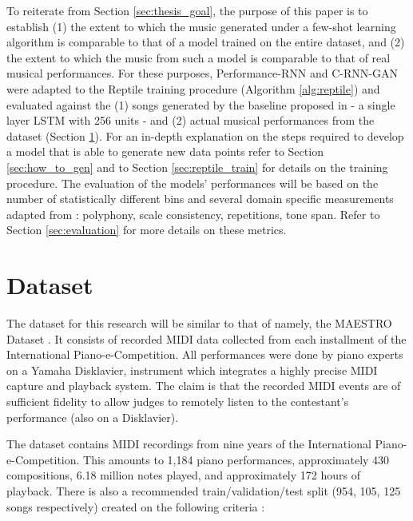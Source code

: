 \documentclass[a4paper]{book}
\begin{document}
To reiterate from Section \ref{sec:thesis_goal}, the purpose of this paper is to establish (1) the extent to which the music generated under a few-shot learning algorithm is comparable to that of a model trained on the entire dataset, and (2) the extent to which the music from such a model is comparable to that of real musical performances. For these purposes, Performance-RNN and C-RNN-GAN were adapted to the Reptile training procedure (Algorithm \ref{alg:reptile}) and evaluated against the (1) songs generated by the baseline proposed in \textcite{larochelle_few-shot_2017} - a single layer LSTM with 256 units - and (2) actual musical performances from the dataset (Section \ref{sec:dataset}). For an in-depth explanation on the steps required to develop a model that is able to generate new data points refer to Section \ref{sec:how_to_gen} and to Section \ref{sec:reptile_train} for details on the training procedure. The evaluation of the models' performances will be based on the number of statistically different bins \parencite[NDB;][]{richardson_gans_2018} and several domain specific measurements adapted from \textcite{mogren_c-rnn-gan_2016}: polyphony, scale consistency, repetitions, tone span. Refer to Section \ref{sec:evaluation} for more details on these metrics.

\section{Dataset} \label{sec:dataset}

The dataset for this research will be similar to that of \parencite{oore_this_2018} namely, the MAESTRO Dataset \parencite{hawthorne_enabling_2018}. It consists of recorded MIDI data collected from each installment of the International Piano-e-Competition. All performances were done by piano experts on a Yamaha Disklavier, instrument which integrates a highly precise MIDI capture and playback system. The claim is that the recorded MIDI events are of sufficient fidelity to allow judges to remotely listen to the contestant's performance (also on a Disklavier).

The dataset contains MIDI recordings from nine years of the International Piano-e-Competition. This amounts to 1,184 piano performances, approximately 430 compositions, 6.18 million notes played, and approximately 172 hours of playback. There is also a recommended train/validation/test split (954, 105, 125 songs respectively) created on the following criteria \parencite{hawthorne_enabling_2018}:
\end{document}
